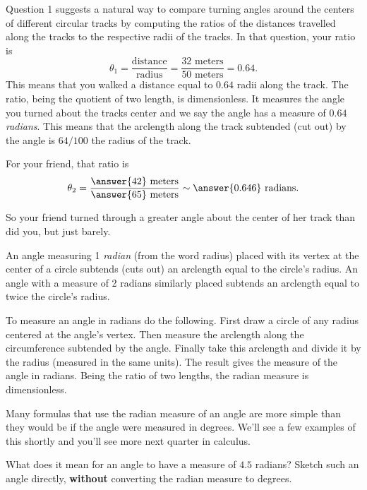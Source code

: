 \documentclass{ximera}
\begin{document}
Question 1 suggests a natural way to compare turning angles around the centers of different circular tracks by computing the ratios of the distances travelled along the tracks to the respective radii of the tracks. In that question, your ratio is
\[
    \theta_1 = \frac{\text{distance}}{\text{radius}} = \frac{32 \text{ meters}}{50 \text{ meters}} = 0.64.
\]
This means that you walked a distance equal to $0.64$ radii along the track. The ratio, being the quotient of two length, is dimensionless. It measures the angle you turned about the tracks center and we say the angle has a measure of $0.64$ \emph{radians}. This means that the arclength along the track subtended (cut out) by the angle is $64/100$ the radius of the track.  

For your friend, that ratio is
\[
       \theta_2 =  \frac{\answer{42} \text{ meters}}{\answer{65} \text{ meters}} \sim \answer{0.646} \text{ radians}.
\]

So your friend turned through a greater angle about the center of her track than did you, but just barely.

An angle measuring 1 \emph{radian} (from the word radius) placed with its vertex at the center of a circle subtends (cuts out) an arclength equal to the circle's radius. An angle with a measure of 2 radians similarly placed subtends an arclength equal to twice the circle's radius. 

To measure an angle in radians do the following. First draw a circle of any radius centered at the angle's vertex. Then measure the arclength along the circumference subtended by the angle. Finally take this arclength and divide it by the radius (measured in the same units). The result gives the measure of the angle in radians. Being the ratio of two lengths, the radian measure is dimensionless.

Many formulas that use the radian measure of an angle are more simple than they would be if the angle were measured in degrees. We'll see a few examples of this shortly and you'll see more next quarter in calculus.


\begin{question} \label{Q1:Radians}
What does it mean for an angle to have a measure of $4.5$ radians? Sketch such an angle directly, {\bf without} converting the radian measure to degrees.
\begin{freeResponse}
\end{freeResponse}
\end{question}
\end{document}
